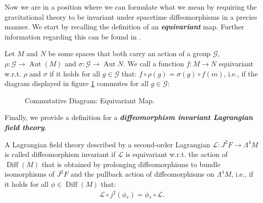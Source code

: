 Now we are in a position where we can formulate what we mean by requiring the gravitational theory to be invariant under spacetime diffeomorphisms in a precise manner. We start by recalling the definition of an \textit{\textbf{equivariant}} map. Further information regarding this can be found in \cite{doi:10.1142/3867}.
\begin{definition}[equivariance]
Let $M$ and $N$ be some spaces that both carry an action of a group $\mathcal{G}$, $\rho : \mathcal{G} \rightarrow \operatorname{Aut}(M)$ and $\sigma : \mathcal{G} \rightarrow \operatorname{Aut}{N}$. We call a function $f : M \rightarrow N$ equivariant w.r.t. $\rho$ and $\sigma$ if it holds for all $g \in \mathcal{G}$ that: $f \circ \rho(g) = \sigma(g) \circ f(m)$, i.e., if the diagram displayed in figure \ref{EquiDia} commutes for all $g \in \mathcal{G}$:
\begin{figure}[hbt!]
\centering
{}
\caption{Commutative Diagram: Equivariant Map.}\label{EquiDia}
\end{figure}
\end{definition}
Finally, we provide a definition for a \textit{\textbf{diffeomorphism invariant Lagrangian field theory}}.
\begin{definition}
A Lagrangian field theory described by a second-order Lagrangian $\mathcal{L} : J^2F \rightarrow \Lambda^4 M$ is called diffeomorphism invariant if $\mathcal{L}$ is equivariant w.r.t. the action of $\operatorname{Diff}(M)$ that is obtained by prolonging diffeomorphisms to bundle isomorphisms of $J^2F$ and the pullback action of diffeomorphisms on $\Lambda^4M$, i.e., if it holds for all $\phi \in \operatorname{Diff}(M)$ that: 
\begin{align}
     \mathcal{L}\circ j^2(\phi_{\ast}) = \phi_{\ast} \circ \mathcal{L}.
\end{align}
\end{definition}

